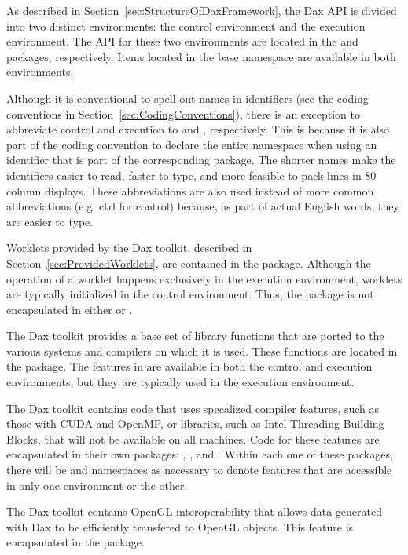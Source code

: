 As described in Section~\ref{sec:StructureOfDaxFramework}, the Dax API is
divided into two distinct environments:  the control
environment  and the execution
environment.  The API for these two
environments are located in the \daxcont{} and \daxexec{} packages,
respectively. Items located in the base \dax{} namespace are available in
both environments.

Although it is conventional to spell out names in identifiers (see the
coding conventions in Section~\ref{sec:CodingConventions}), there is an
exception to abbreviate control and execution to 
and , respectively. This is because it is also part of
the coding convention to declare the entire namespace when using an
identifier that is part of the corresponding package. The shorter names
make the identifiers easier to read, faster to type, and more feasible to
pack lines in 80 column displays. These abbreviations are also used instead
of more common abbreviations (e.g. ctrl for control) because, as part of
actual English words, they are easier to type.

Worklets provided by the Dax toolkit, described in
Section~\ref{sec:ProvidedWorklets}, are contained in the \daxworklet{}
package. Although the operation of a worklet happens exclusively in the
execution environment, worklets are typically initialized in the control
environment. Thus, the \daxworklet{} package is not encapsulated in either
\daxcont{} or \daxexec{}.

The Dax toolkit provides a base set of library functions that are ported to
the various systems and compilers on which it is used. These functions are
located in the \daxmath{} package. The features in \daxmath{} are available
in both the control and execution environments, but they are typically used
in the execution environment.

The Dax toolkit contains code that uses specalized compiler features, such
as those with CUDA and OpenMP, or libraries, such as Intel Threading
Building Blocks, that will not be available on all machines. Code for these
features are encapsulated in their own packages: \daxcuda{}, \daxopenmp{},
and \daxtbb{}. Within each one of these packages, there will
be  and  namespaces as necessary to
denote features that are accessible in only one environment or the other.

The Dax toolkit contains OpenGL interoperability 
 that allows data generated with Dax to be
efficiently transfered to OpenGL objects. This feature is encapsulated in
the \daxopengl{} package.

